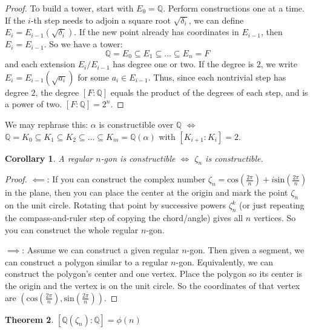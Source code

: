 \documentclass{article}
\theoremstyle{plain}
\newtheorem{thm}{Theorem}
\newtheorem{cor}[thm]{Corollary}
\theoremstyle{definition}
\newcommand{\Q}{\mathbb{Q}}
\begin{document}
\begin{proof}
    To build a tower, start with $E_0 = \Q$. Perform constructions one at a time. If the $i$-th step needs to adjoin a square root $\sqrt{\delta_i}$, we can define $E_i = E_{i-1}(\sqrt{\delta_i})$. If the new point already has coordinates in $E_{i-1}$, then $E_i = E_{i-1}$. So we have a tower: \begin{equation}
        \Q = E_0 \subseteq E_1 \subseteq \dots \subseteq E_n = F
    \end{equation} and each extension $E_i/E_{i-1}$ has degree one or two. If the degree is $2$, we write $E_i = E_{i-1}(\sqrt{a_i})$ for some $a_i \in E_{i-1}$. Thus, since each nontrivial step has degree $2$, the degree $[F:\Q]$ equals the product of the degrees of each step, and is a power of two. $[F:\Q] = 2^n$.
\end{proof}

We may rephrase this: $\alpha$ is constructible over $\Q$ $\iff$ $\Q = K_0 \subseteq K_1 \subseteq K_2 \subseteq \dots \subseteq K_m = \Q(\alpha)$ with $[K_{i+1}:K_i] = 2$. 

\begin{cor}
    A regular $n$-gon is constructible $\iff$ $\zeta_n$ is constructible. 
\end{cor}

\begin{proof} 
    $\impliedby$: If you can construct the complex number $\zeta_n = \text{cos}(\frac{2\pi}{n}) + i\text{sin}(\frac{2\pi}{n})$ in the plane, then you can place the center at the origin and mark the point $\zeta_n$ on the unit circle. Rotating that point by successive powers $\zeta_n^k$ (or just repeating the compass-and-ruler step of copying the chord/angle) gives all $n$ vertices. So you can construct the whole regular $n$-gon. \checkmark

    \noindent $\implies$: Assume we can construct a given regular $n$-gon. Then given a segment, we can construct a polygon similar to a regular $n$-gon. Equivalently, we can construct the polygon's center and one vertex. Place the polygon so its center is the origin and the vertex is on the unit circle. So the coordinates of that vertex are $(\text{cos}(\frac{2\pi}{n}), \text{sin}(\frac{2\pi}{n}))$. \checkmark
    
\end{proof}

\begin{thm}
    $[\Q(\zeta_n):\Q] = \phi(n)$
\end{thm}
\end{document}
